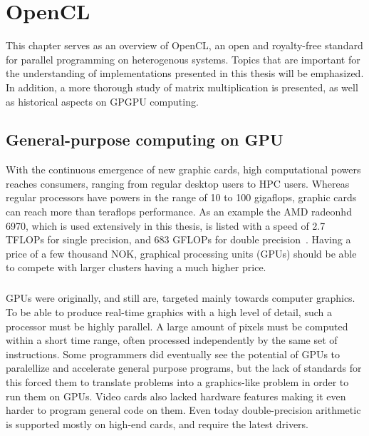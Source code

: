 \chapter{OpenCL}
\label{ch:OpenCL}
This chapter serves as an overview of OpenCL, an open and royalty-free standard for parallel programming on heterogenous systems.
Topics that are important for the understanding of implementations presented in this thesis will be emphasized.
In addition, a more thorough study of matrix multiplication is presented, as well as historical aspects on GPGPU computing.


\section{General-purpose computing on GPU}
With the continuous emergence of new graphic cards, high computational powers reaches consumers, ranging from regular desktop users to HPC users.
Whereas regular processors have powers in the range of 10 to 100 gigaflops, graphic cards can reach more than teraflops performance.
As an example the AMD radeonhd 6970, which is used extensively in this thesis, is listed with a speed of 2.7 TFLOPs for single precision, and 683 GFLOPs for double precision~\cite{radeon6970}.
Having a price of a few thousand NOK, graphical processing units (GPUs) should be able to compete with larger clusters having a much higher price.

\paragraph*{}
GPUs were originally, and still are, targeted mainly towards computer graphics.
To be able to produce real-time graphics with a high level of detail, such a processor must be highly parallel.
A large amount of pixels must be computed within a short time range, often processed independently by the same set of instructions.
Some programmers did eventually see the potential of GPUs to paralellize and accelerate general purpose programs, but the lack of standards for this forced them to translate problems into a graphics-like problem in order to run them on GPUs.
Video cards also lacked hardware features making it even harder to program general code on them.
Even today double-precision arithmetic is supported mostly on high-end cards, and require the latest drivers.

